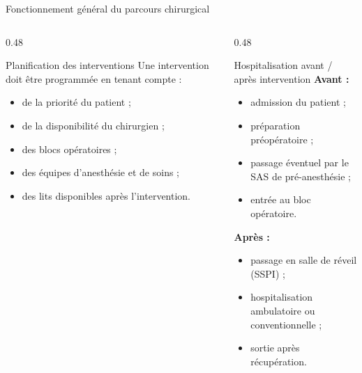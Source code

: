 \begin{frame}{Fonctionnement général du parcours chirurgical}

  \begin{columns}[T]

    \begin{column}{0.48\textwidth}

      \begin{block}{Planification des interventions}
        Une intervention doit être programmée en tenant compte :
        \begin{itemize}
          \item de la priorité du patient ;
          \item de la disponibilité du chirurgien ;
          \item des blocs opératoires ;
          \item des équipes d'anesthésie et de soins ;
          \item des lits disponibles après l'intervention.
        \end{itemize}
      \end{block}

    \end{column}

    \begin{column}{0.48\textwidth}

      \begin{block}{Hospitalisation avant / après intervention}
        \textbf{Avant :}
        \begin{itemize}
          \item admission du patient ;
          \item préparation préopératoire ;
          \item passage éventuel par le SAS de pré-anesthésie ;
          \item entrée au bloc opératoire.
        \end{itemize}

        \textbf{Après :}
        \begin{itemize}
          \item passage en salle de réveil (SSPI) ;
          \item hospitalisation ambulatoire ou conventionnelle ;
          \item sortie après récupération.
        \end{itemize}
      \end{block}

    \end{column}

  \end{columns}

\end{frame}

